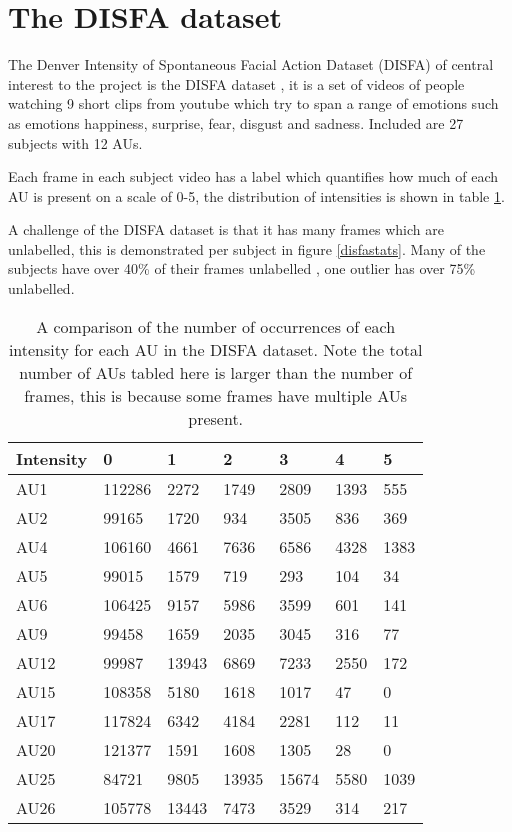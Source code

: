 \section{The DISFA dataset} \label{disfa_list}
The Denver Intensity of Spontaneous Facial Action Dataset (DISFA)
of central interest to the project is the DISFA dataset \cite{disfa}, it is a set
of videos of people watching 9 short clips from youtube which try to span a range
of emotions such as emotions happiness, surprise, fear, disgust and sadness. Included
are 27 subjects with 12 AUs.

Each frame in each subject video has a label which quantifies how much of each
AU is present on a scale of 0-5, the distribution of intensities is shown in table \ref{compau}.

A challenge of the DISFA dataset is that it has many frames which are unlabelled, this is demonstrated
per subject in figure \ref{disfastats}. Many of the subjects have over 40\% of their frames unlabelled
, one outlier has over 75\% unlabelled.

\begin{table}[h!]
\centering

\begin{tabular}{lllllll}
\hline
Intensity & 0      & 1     & 2     & 3     & 4    & 5    \\ \hline
AU1       & 112286 & 2272  & 1749  & 2809  & 1393 & 555  \\
AU2       & 99165  & 1720  & 934   & 3505  & 836  & 369  \\
AU4       & 106160 & 4661  & 7636  & 6586  & 4328 & 1383 \\
AU5       & 99015  & 1579  & 719   & 293   & 104  & 34   \\
AU6       & 106425 & 9157  & 5986  & 3599  & 601  & 141  \\
AU9       & 99458  & 1659  & 2035  & 3045  & 316  & 77   \\
AU12      & 99987  & 13943 & 6869  & 7233  & 2550 & 172  \\
AU15      & 108358 & 5180  & 1618  & 1017  & 47   & 0    \\
AU17      & 117824 & 6342  & 4184  & 2281  & 112  & 11   \\
AU20      & 121377 & 1591  & 1608  & 1305  & 28   & 0    \\
AU25      & 84721  & 9805  & 13935 & 15674 & 5580 & 1039 \\
AU26      & 105778 & 13443 & 7473  & 3529  & 314  & 217  \\ \hline
\end{tabular}
\caption{A comparison of the number of occurrences of each intensity for each AU in the DISFA dataset. Note the total number
of AUs tabled here is larger than the number of frames, this is because some frames have multiple AUs present.} \label{compau}
\end{table}


